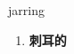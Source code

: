 
\begin{frame}
{\huge jarring}
\begin{center}
\begin{enumerate}\Large
  \item \textbf{刺耳的}
\end{enumerate}
\end{center}
\end{frame}

